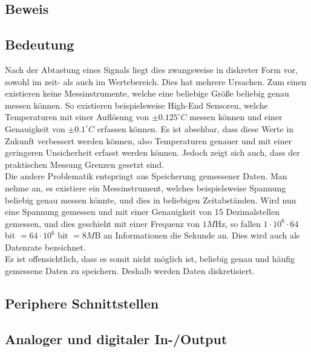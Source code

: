 \subsection{Beweis}\label{3.2}
\subsection{Bedeutung}\label{3.3}

Nach der Abtastung eines Signals liegt dies zwangsweise in diskreter Form vor, sowohl im zeit- als auch im Wertebereich. Dies hat mehrere Ursachen. Zum einen existieren keine Messinstrumente, welche eine beliebige Größe beliebig genau messen können. So existieren beispielsweise High-End Sensoren, welche Temperaturen mit einer Auflösung von $\pm0.125^\circ C$ messen können und einer Genauigkeit von $\pm0.1^\circ C$ erfassen können. Es ist absehbar, dass diese Werte in Zukunft verbessert werden können, also Temperaturen genauer und mit einer geringeren Unsicherheit erfasst werden können. Jedoch zeigt sich auch, dass der praktischen Messung Grenzen gesetzt sind.\\
Die andere Problematik entspringt aus Speicherung gemessener Daten. Man nehme an, es existiere ein Messinstrument, welches beispielsweise Spannung beliebig genau messen könnte, und dies in beliebigen Zeitabständen. Wird nun eine Spannung gemessen und mit einer Genauigkeit von 15 Dezimalstellen gemessen, und dies geschieht mit einer Frequenz von $1M$Hz, so fallen $1 \cdot 10^6 \cdot 64$ bit $= 64 \cdot 10^6$ bit $= 8M$B an Informationen die Sekunde an. Dies wird auch als Datenrate bezeichnet.\\
Es ist offensichtlich, dass es somit nicht möglich ist, beliebig genau und häufig gemessene Daten zu speichern. Deshalb werden Daten diskretisiert.\\

\subsection{Periphere Schnittstellen}\label{3.4}
\subsection{Analoger und digitaler In-/Output}\label{3.5}
